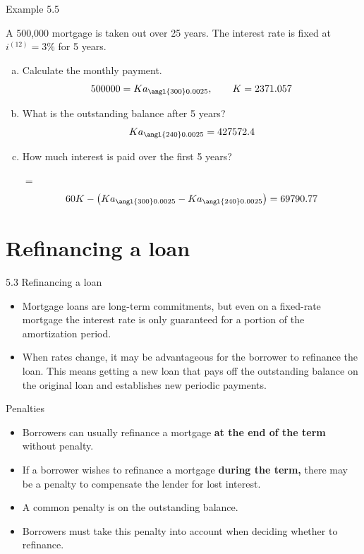 \documentclass{beamer}
\begin{document}
\begin{frame}{Example 5.5}

A 500,000 mortgage is taken out over 25 years. The interest rate is fixed at $i^{(12)} = 3\%$ for 5 years.
\begin{enumerate}[a)]
\item Calculate the monthly payment.
\[
500000 = K a_{\angl{300}0.0025}, \qquad K = 2371.057
\]
\item What is the outstanding balance after 5 years?
\[
K a_{\angl{240}0.0025} = 427572.4
\]
\item How much interest is paid over the first 5 years?

 $=$
\[
60K - \left(K a_{\angl{300}0.0025} - K a_{\angl{240}0.0025}\right) = 69790.77
\]
\end{enumerate}

\end{frame}

\section{Refinancing a loan}

\begin{frame}{5.3 Refinancing a loan}

\begin{itemize}
\item Mortgage loans are long-term commitments, but even on a fixed-rate mortgage the interest rate is only guaranteed for a portion of the amortization period.
\bigskip
\item When rates change, it may be advantageous for the borrower to refinance the loan. This means getting a new loan that pays off the outstanding balance on the original loan and establishes new periodic payments.
\end{itemize}

\end{frame}

\begin{frame}{Penalties}

\begin{itemize}
\item Borrowers can usually refinance a mortgage \textbf{at the end of the term} without penalty.
\medskip
\item If a borrower wishes to refinance a mortgage \textbf{during the term,} there may be a penalty to compensate the lender for lost interest.
\medskip
\item A common penalty is  on the outstanding balance.
\medskip
\item Borrowers must take this penalty into account when deciding whether to refinance.
\end{itemize}

\end{frame}
\end{document}
